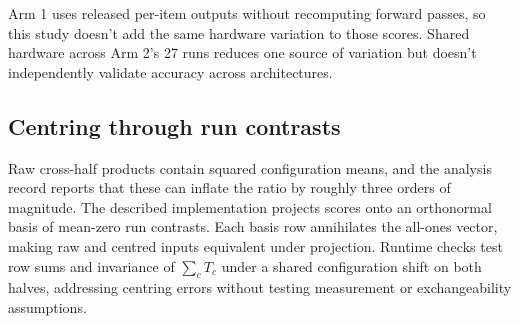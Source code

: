 Arm 1 uses released per-item outputs without recomputing forward passes, so this study doesn't add the same hardware variation to those scores. Shared hardware across Arm 2's 27 runs reduces one source of variation but doesn't independently validate accuracy across architectures.

\subsection{Centring through run contrasts}
\label{app:centring}
Raw cross-half products contain squared configuration means, and the analysis record reports that these can inflate the ratio by roughly three orders of magnitude. The described implementation projects scores onto an orthonormal basis of mean-zero run contrasts. Each basis row annihilates the all-ones vector, making raw and centred inputs equivalent under projection. Runtime checks test row sums and invariance of $\sum_c T_c$ under a shared configuration shift on both halves, addressing centring errors without testing measurement or exchangeability assumptions.

